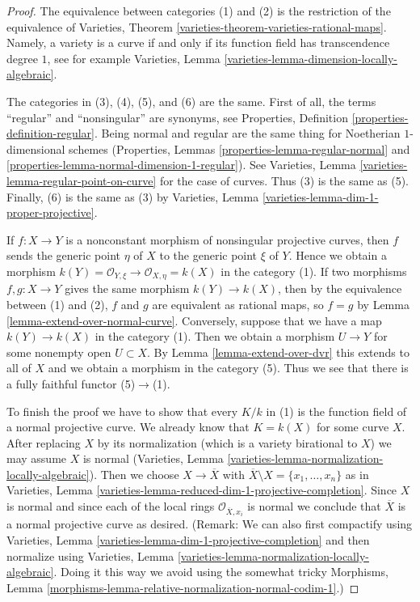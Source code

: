 \documentclass{stacks-project}
\theoremstyle{plain}
\theoremstyle{definition}
\theoremstyle{remark}
\numberwithin{equation}{subsection}
\begin{document}
\begin{proof}
The equivalence between categories (1) and (2) is the restriction of the
equivalence of
Varieties, Theorem \ref{varieties-theorem-varieties-rational-maps}.
Namely, a variety is a curve if and only if its function field has
transcendence degree $1$, see for example
Varieties, Lemma \ref{varieties-lemma-dimension-locally-algebraic}.

\medskip\noindent
The categories in (3), (4), (5), and (6) are the same. First of all, the
terms ``regular'' and ``nonsingular'' are synonyms, see
Properties, Definition \ref{properties-definition-regular}.
Being normal and regular are the same thing for Noetherian
$1$-dimensional schemes
(Properties, Lemmas \ref{properties-lemma-regular-normal} and
\ref{properties-lemma-normal-dimension-1-regular}). See
Varieties, Lemma \ref{varieties-lemma-regular-point-on-curve}
for the case of curves. Thus (3) is the same as (5). Finally, (6)
is the same as (3) by
Varieties, Lemma \ref{varieties-lemma-dim-1-proper-projective}.

\medskip\noindent
If $f : X \to Y$ is a nonconstant morphism of nonsingular projective curves,
then $f$ sends the generic point $\eta$ of $X$ to the generic point $\xi$ of
$Y$. Hence we obtain a morphism
$k(Y) = \mathcal{O}_{Y, \xi} \to \mathcal{O}_{X, \eta} = k(X)$
in the category (1). If two morphisms $f,g: X \to Y$ gives the same morphism
$k(Y) \to k(X)$, then by the equivalence between (1) and (2),
$f$ and $g$ are equivalent as rational maps, so $f=g$ by
Lemma \ref{lemma-extend-over-normal-curve}.
Conversely, suppose that we have a map
$k(Y) \to k(X)$ in the category (1). Then we obtain a morphism $U \to Y$
for some nonempty open $U \subset X$. By Lemma \ref{lemma-extend-over-dvr}
this extends to all of $X$ and we obtain a morphism in the category (5).
Thus we see that there is a fully faithful functor (5)$\to$(1).

\medskip\noindent
To finish the proof we have to show that every $K/k$ in (1)
is the function field of a normal projective curve.
We already know that $K = k(X)$ for some curve $X$.
After replacing $X$ by its normalization
(which is a variety birational to $X$)
we may assume $X$ is normal
(Varieties, Lemma \ref{varieties-lemma-normalization-locally-algebraic}).
Then we choose $X \to \overline{X}$ with
$\overline{X} \setminus X = \{x_1, \ldots, x_n\}$ as in
Varieties, Lemma \ref{varieties-lemma-reduced-dim-1-projective-completion}.
Since $X$ is normal and since each
of the local rings $\mathcal{O}_{\overline{X}, x_i}$ is normal
we conclude that $\overline{X}$ is a normal projective curve as desired.
(Remark: We can also first compactify using
Varieties, Lemma \ref{varieties-lemma-dim-1-projective-completion}
and then normalize using
Varieties, Lemma \ref{varieties-lemma-normalization-locally-algebraic}.
Doing it this way we avoid using the somewhat tricky
Morphisms, Lemma \ref{morphisms-lemma-relative-normalization-normal-codim-1}.)
\end{proof}
\end{document}
